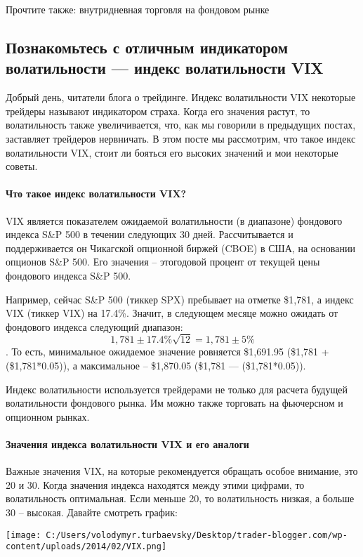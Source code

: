\documentclass[a5paper]{article}
\begin{document}
Прочтите также: внутридневная торговля на фондовом рынке

\subsection{Познакомьтесь с отличным индикатором волатильности —
  индекс волатильности VIX}

Добрый день, читатели блога  о трейдинге. Индекс волатильности VIX некоторые трейдеры называют индикатором страха. Когда его значения растут, то волатильность также увеличивается, что, как мы говорили в предыдущих постах, заставляет трейдеров нервничать. В этом посте мы рассмотрим, что такое индекс волатильности VIX, стоит ли бояться его высоких значений и мои некоторые советы.

\paragraph{Что такое индекс волатильности VIX?}

VIX является показателем ожидаемой волатильности (в диапазоне) фондового индекса S\&P 500 в течении следующих 30 дней. Рассчитывается и поддерживается он Чикагской опционной биржей (CBOE) в США, на основании опционов S\&P 500. Его значения – этогодовой процент от текущей цены фондового индекса S\&P 500.

Например, сейчас S\&P 500 (тиккер SPX) пребывает на отметке \$1,781, а индекс VIX (тиккер VIX) на 17.4\%. Значит, в следующем месяце можно ожидать от фондового индекса следующий диапазон: $$1,781 \pm 17.4\%\sqrt{12} = 1,781 \pm 5\%$$. То есть, минимальное ожидаемое значение ровняется \$1,691.95 (\$1,781 + (\$1,781*0.05)), а максимальное – \$1,870.05 (\$1,781 — (\$1,781*0.05)).

Индекс волатильности используется трейдерами не только для расчета
будущей волатильности фондового рынка. Им можно также торговать на
фьючерсном и опционном рынках.

\paragraph{Значения индекса волатильности VIX и его аналоги}

Важные значения VIX, на которые рекомендуется обращать особое внимание, это 20 и 30. Когда значения индекса находятся между этими цифрами, то волатильность оптимальная. Если меньше 20, то волатильность низкая, а больше 30 – высокая. Давайте смотреть график:

\texttt{[image: C:/Users/volodymyr.turbaevsky/Desktop/trader-blogger.com/wp-content/uploads/2014/02/VIX.png]}
\end{document}
